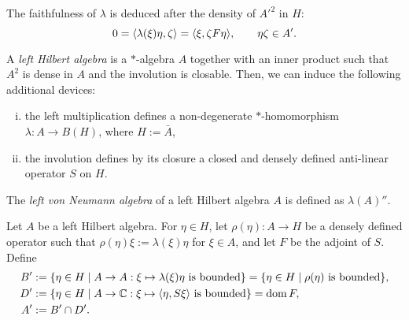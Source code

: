 \documentclass{../../small}
\begin{document}
The faithfulness of $\lambda$ is deduced after the density of $A'^2$ in $H$:
\[0=\langle\lambda(\xi)\eta,\zeta\rangle=\langle\xi,\zeta F\eta\rangle,\qquad\eta\zeta\in A'.\]

\begin{defn}
A \emph{left Hilbert algebra} is a $*$-algebra $A$ together with an inner product such that $A^2$ is dense in $A$ and the involution is closable.
Then, we can induce the following additional devices:
\begin{enumerate}[(i)]
\item the left multiplication defines a non-degenerate $*$-homomorphism $\lambda:A\to B(H)$, where $H:=\bar A$,
\item the involution defines by its closure a closed and densely defined anti-linear operator $S$ on $H$.
\end{enumerate}
The \emph{left von Neumann algebra} of a left Hilbert algebra $A$ is defined as $\lambda(A)''$.
\end{defn}


\begin{defn}
Let $A$ be a left Hilbert algebra.
For $\eta\in H$, let $\rho(\eta):A\to H$ be a densely defined operator such that $\rho(\eta)\xi:=\lambda(\xi)\eta$ for $\xi\in A$, and let $F$ be the adjoint of $S$.
Define
\begin{align*}
B'&:=\{\eta\in H\mid A\to A:\xi\mapsto\lambda(\xi)\eta\text{ is bounded}\}=\{\eta\in H\mid\rho(\eta)\text{ is bounded}\},\\
D'&:=\{\eta\in H\mid A\to\mathbb{C}:\xi\mapsto\langle\eta,S\xi\rangle\text{ is bounded}\}=\operatorname{dom} F,\\
A'&:=B'\cap D'.
\end{align*}
\end{defn}
\end{document}
